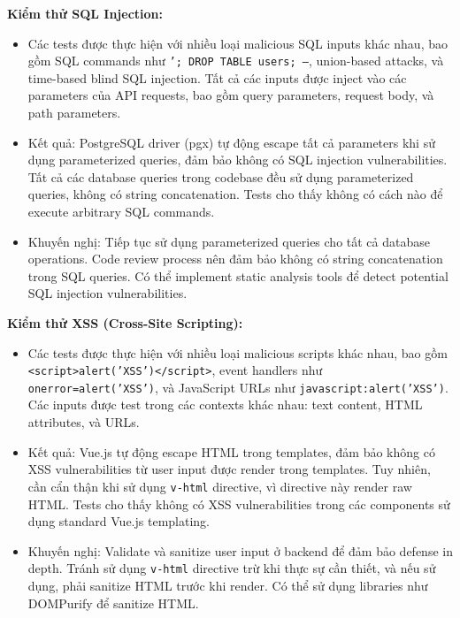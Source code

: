 \textbf{Kiểm thử SQL Injection:}
\begin{itemize}
    \item Các tests được thực hiện với nhiều loại malicious SQL inputs khác nhau, bao gồm SQL commands như \texttt{'; DROP TABLE users; --}, union-based attacks, và time-based blind SQL injection. Tất cả các inputs được inject vào các parameters của API requests, bao gồm query parameters, request body, và path parameters.
    
    \item Kết quả: PostgreSQL driver (pgx) tự động escape tất cả parameters khi sử dụng parameterized queries, đảm bảo không có SQL injection vulnerabilities. Tất cả các database queries trong codebase đều sử dụng parameterized queries, không có string concatenation. Tests cho thấy không có cách nào để execute arbitrary SQL commands.
    
    \item Khuyến nghị: Tiếp tục sử dụng parameterized queries cho tất cả database operations. Code review process nên đảm bảo không có string concatenation trong SQL queries. Có thể implement static analysis tools để detect potential SQL injection vulnerabilities.
\end{itemize}

\textbf{Kiểm thử XSS (Cross-Site Scripting):}
\begin{itemize}
    \item Các tests được thực hiện với nhiều loại malicious scripts khác nhau, bao gồm \texttt{<script>alert('XSS')</script>}, event handlers như \texttt{onerror=alert('XSS')}, và JavaScript URLs như \texttt{javascript:alert('XSS')}. Các inputs được test trong các contexts khác nhau: text content, HTML attributes, và URLs.
    
    \item Kết quả: Vue.js tự động escape HTML trong templates, đảm bảo không có XSS vulnerabilities từ user input được render trong templates. Tuy nhiên, cần cẩn thận khi sử dụng \texttt{v-html} directive, vì directive này render raw HTML. Tests cho thấy không có XSS vulnerabilities trong các components sử dụng standard Vue.js templating.
    
    \item Khuyến nghị: Validate và sanitize user input ở backend để đảm bảo defense in depth. Tránh sử dụng \texttt{v-html} directive trừ khi thực sự cần thiết, và nếu sử dụng, phải sanitize HTML trước khi render. Có thể sử dụng libraries như DOMPurify để sanitize HTML.
\end{itemize}

